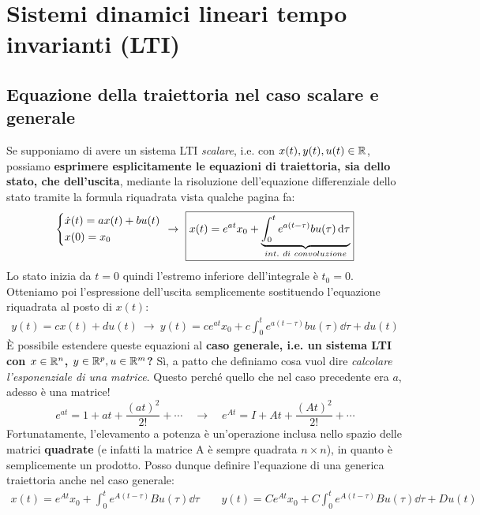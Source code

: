 \documentclass[a4paper]{report}
\begin{document}
\section{Sistemi dinamici lineari tempo invarianti (LTI)}

\subsection{Equazione della traiettoria nel caso scalare e generale}
Se supponiamo di avere un sistema LTI \textit{scalare}, i.e. con $x(t),y(t),u(t) \in \mathbb{R}$, possiamo \textbf{esprimere esplicitamente le equazioni di traiettoria, sia dello stato, che dell'uscita}, mediante la risoluzione dell'equazione differenziale dello stato tramite la formula riquadrata vista qualche pagina fa:
\begin{align*}
	\begin{dcases}
	\dot x(t) = ax(t) + bu(t) \\
	x(0) = x_0
	\end{dcases} \ \rightarrow \ \boxed{x(t) =e^{at}x_0+\underbrace{\int_0^te^{a(t-\tau)}bu(\tau)\dd{\tau}}_{int. \ di \ convoluzione}}
\end{align*}
Lo stato inizia da $t= 0$ quindi l'estremo inferiore dell'integrale è $t_0  = 0.$ Otteniamo poi l'espressione dell'uscita semplicemente sostituendo l'equazione riquadrata al posto di $x(t)$:
\begin{align*}
	y(t) = cx(t) +du(t) \ \rightarrow \ \boxed{y(t) = ce^{at}x_0+c\int_0^te^{a(t-\tau)}bu(\tau)\dd{\tau} + du(t)}
\end{align*}
\bb
È possibile estendere queste equazioni al \textbf{caso generale, i.e. un sistema LTI con $x \in \mathbb{R}^n$, $y \in \mathbb{R}^p, u \in \mathbb{R}^m$?} Sì, a patto che definiamo cosa vuol dire \textit{calcolare l'esponenziale di una matrice}. Questo perché quello che nel caso precedente era $a$, adesso è una matrice!
\begin{equation*}
	e^{at} = 1+at + \frac{(at)^2}{2!} + \cdots  \quad \longrightarrow \quad e^{At} = I+ At+\frac{(At)^2}{2!} + \cdots 
\end{equation*}
Fortunatamente, l'elevamento a potenza è un'operazione inclusa nello spazio delle matrici \textbf{quadrate} (e infatti la matrice A è sempre quadrata $n\times n$), in quanto è semplicemente un prodotto. Posso dunque definire l'equazione di una generica traiettoria anche nel caso generale:
\begin{align*}
	\boxed{x(t) =e^{At}x_0+\int_0^te^{A(t-\tau)}Bu(\tau)\dd{\tau} \quad \quad y(t) = Ce^{At}x_0+C\int_0^te^{A(t-\tau)}Bu(\tau)\dd{\tau}  + Du(t)}	
\end{align*}
\end{document}
